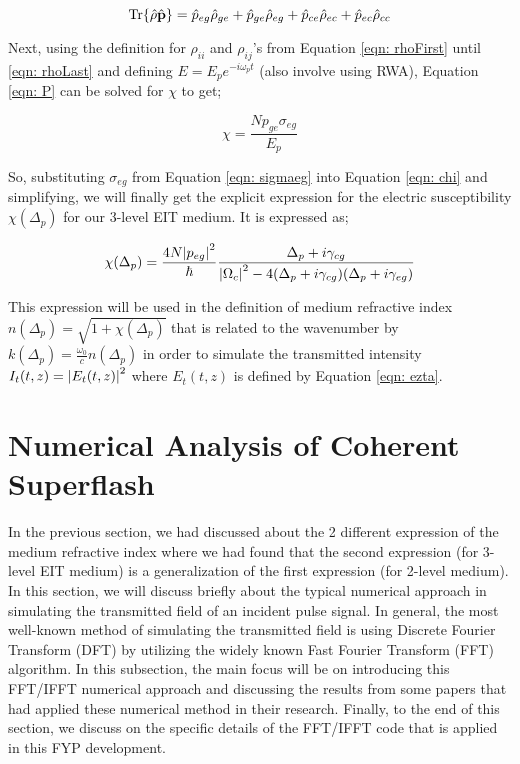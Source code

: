 \begin{equation}
    \Tr{\hat{\vb{\rho}} \hat{\vb{p}}} = \hat{p}_{eg} \hat{\rho}_{ge} + \hat{p}_{ge} \hat{\rho}_{eg} + \hat{p}_{ce} \hat{\rho}_{ec} + \hat{p}_{ec} \hat{\rho}_{cc}
\end{equation}

Next, using the definition for $\rho_{ii}$ and $\rho_{ij}$'s from Equation \ref{eqn: rhoFirst} until \ref{eqn: rhoLast} and defining $E = E_{p} e^{-i \omega_{p} t}$ (also involve using RWA), Equation \ref{eqn: P} can be solved for $\chi$ to get;

\begin{equation}
    \chi = \frac{N p_{ge} \sigma_{eg}}{E_{p}}
    \label{eqn: chi}
\end{equation}

So, substituting $\sigma_{eg}$ from Equation \ref{eqn: sigmaeg} into Equation \ref{eqn: chi} and simplifying, we will finally get the explicit expression for the electric susceptibility $\chi(\Delta_{p})$ for our 3-level EIT medium. It is expressed as;

\begin{equation}
    \chi(\Delta_{p}) = \frac{4 N \abs{p_{eg}}^{2}}{\hbar} \frac{\Delta_{p} + i \gamma_{cg}}{\abs{\Omega_{c}}^{2} - 4(\Delta_{p} + i \gamma_{cg})(\Delta_{p} + i \gamma_{eg})}
\end{equation}

This expression will be used in the definition of medium refractive index $n(\Delta_{p}) = \sqrt{1 + \chi(\Delta_{p})}$ that is related to the wavenumber by $k(\Delta_{p}) = \frac{\omega_{0}}{c} n(\Delta_{p})$ in order to simulate the transmitted intensity $I_{t}(t, z) = \abs{E_{t}(t, z)}^{2}$ where $E_{t}(t, z)$ is defined by Equation \ref{eqn: ezta}.


\section{Numerical Analysis of Coherent Superflash}\label{numerical}
In the previous section, we had discussed about the 2 different expression of the medium refractive index where we had found that the second expression (for 3-level EIT medium) is a generalization of the first expression (for 2-level medium). In this section, we will discuss briefly about the typical numerical approach in simulating the transmitted field of an incident pulse signal. In general, the most well-known method of simulating the transmitted field is using Discrete Fourier Transform (DFT) by utilizing the widely known Fast Fourier Transform (FFT) algorithm. In this subsection, the main focus will be on introducing this FFT/IFFT numerical approach and discussing the results from some papers that had applied these numerical method in their research. Finally, to the end of this section, we discuss on the specific details of the FFT/IFFT code that is applied in this FYP development.


